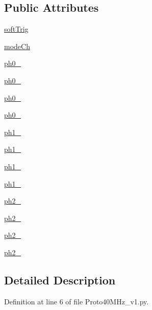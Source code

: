 \subsection*{Public Attributes}
\begin{DoxyCompactItemize}
\item 
\hyperlink{classProto40MHz__v1_1_1Proto40MHz__v1_a837aa12ca0e43af01df312a3bdffbcdc}{softTrig}
\item 
\hyperlink{classProto40MHz__v1_1_1Proto40MHz__v1_ae44e4ded38989bfd42444e5ed2b0afd2}{modeCh}
\item 
\hyperlink{classProto40MHz__v1_1_1Proto40MHz__v1_a8ddc164a68a24aad22bbfe3750b11134}{ph0\_}
\item 
\hyperlink{classProto40MHz__v1_1_1Proto40MHz__v1_ab1d60c0423b043bf6bbf7c12f50fc008}{ph0\_}
\item 
\hyperlink{classProto40MHz__v1_1_1Proto40MHz__v1_ad7daab7edeaf155a8567346b70739826}{ph0\_}
\item 
\hyperlink{classProto40MHz__v1_1_1Proto40MHz__v1_a574873093a0f4902bf605a40391d7ad2}{ph0\_}
\item 
\hyperlink{classProto40MHz__v1_1_1Proto40MHz__v1_a255b956cb76bf7aac392d89793a2a831}{ph1\_}
\item 
\hyperlink{classProto40MHz__v1_1_1Proto40MHz__v1_a94fac43157e379feec01f8b4c75483bf}{ph1\_}
\item 
\hyperlink{classProto40MHz__v1_1_1Proto40MHz__v1_a35939c32ed2964aee5ba9610c1dbd61f}{ph1\_}
\item 
\hyperlink{classProto40MHz__v1_1_1Proto40MHz__v1_a34144793d105870120b41def28882c10}{ph1\_}
\item 
\hyperlink{classProto40MHz__v1_1_1Proto40MHz__v1_ac3bc9dba74dec68054463072e477f3cb}{ph2\_}
\item 
\hyperlink{classProto40MHz__v1_1_1Proto40MHz__v1_a4f0fb6edd445fd627b0a22b815444de2}{ph2\_}
\item 
\hyperlink{classProto40MHz__v1_1_1Proto40MHz__v1_a1413edb9954054c0e4086c110d2bf91a}{ph2\_}
\item 
\hyperlink{classProto40MHz__v1_1_1Proto40MHz__v1_a732c98795a303cf24ccca6615c2566a5}{ph2\_}
\end{DoxyCompactItemize}


\subsection{Detailed Description}


Definition at line 6 of file Proto40MHz\_\-v1.py.

